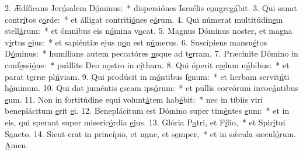 2. Ædíficans Jer\uline{ú}salem D\uline{ó}minus:~* dispersiónes Israélis c\uline{o}ngreg\uline{á}bit.
3. Qui sanat contr\uline{í}tos c\uline{o}rde:~* et álligat contriti\uline{ó}nes e\uline{ó}rum.
4. Qui númerat multitúdin\uline{e}m stell\uline{á}rum:~* et ómnibus eis n\uline{ó}mina v\uline{o}cat.
5. Magnus Dóminus noster, et magna v\uline{i}rtus \uline{e}jus:~* et sapiéntiæ ejus n\uline{o}n est n\uline{ú}merus.
6. Suscípiens mansu\uline{é}tos D\uline{ó}minus:~* humílians autem peccatóres \uline{u}sque ad t\uline{e}rram.
7. Præcínite Dómino in conf\uline{e}ssi\uline{ó}ne:~* psállite Deo n\uline{o}stro in c\uline{í}thara.
8. Qui óperit c\uline{æ}lum n\uline{ú}bibus:~* et parat t\uline{e}rræ pl\uline{ú}viam.
9. Qui prodúcit in m\uline{ó}ntibus f\uline{e}num:~* et herbam servit\uline{ú}ti h\uline{ó}minum.
10. Qui dat juméntis \uline{e}scam ips\uline{ó}rum:~* et pullis corvórum invoc\uline{á}ntibus \uline{e}um.
11. Non in fortitúdine equi volunt\uline{á}tem hab\uline{é}bit:~* nec in tíbiis viri beneplácitum \uline{e}rit \uline{e}i.
12. Beneplácitum est Dómino super tim\uline{é}ntes \uline{e}um:~* et in eis, qui sperant super miseric\uline{ó}rdia \uline{e}jus.
13. Glória P\uline{a}tri, et F\uline{í}lio,~* et Spir\uline{í}tui S\uline{a}ncto.
14. Sicut erat in princípio, et n\uline{u}nc, et s\uline{e}mper,~* et in sǽcula sæcul\uline{ó}rum. \uline{A}men.
